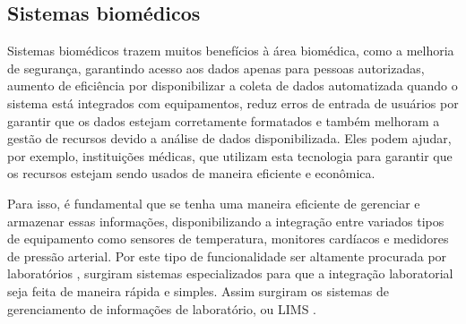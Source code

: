 \subsection{Sistemas biomédicos}

Sistemas biomédicos trazem muitos benefícios à área biomédica, como a melhoria de segurança, garantindo acesso aos dados apenas para pessoas autorizadas, aumento de eficiência por disponibilizar a coleta de dados automatizada quando o sistema está integrados com equipamentos, reduz erros de entrada de usuários por garantir que os dados estejam corretamente formatados e também melhoram a gestão de recursos devido a análise de dados disponibilizada. Eles podem ajudar, por exemplo, instituições médicas, que utilizam esta tecnologia para garantir que os recursos estejam sendo usados de maneira eficiente e econômica.

Para isso, é fundamental que se tenha uma maneira eficiente de gerenciar e armazenar essas informações, disponibilizando a integração entre variados tipos de equipamento como sensores de temperatura, monitores cardíacos e medidores de pressão arterial. Por este tipo de funcionalidade ser altamente procurada por laboratórios \R, surgiram sistemas especializados para que a integração laboratorial seja feita de maneira rápida e simples. Assim surgiram os sistemas de gerenciamento de informações de laboratório, ou LIMS \R.







